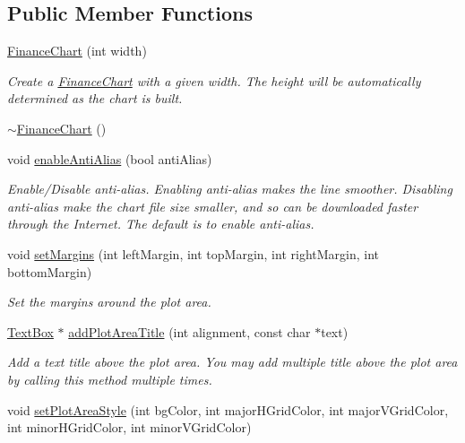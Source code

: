 \subsection*{Public Member Functions}
\begin{DoxyCompactItemize}
\item 
\hyperlink{class_finance_chart_a044a1d55c37501ea29ed2b5916faf0e1}{Finance\+Chart} (int width)
\begin{DoxyCompactList}\small\item\em Create a \hyperlink{class_finance_chart}{Finance\+Chart} with a given width. The height will be automatically determined as the chart is built. \end{DoxyCompactList}\item 
\hyperlink{class_finance_chart_a1e7439001aaf137a55e33a1add07f1eb}{$\sim$\+Finance\+Chart} ()
\item 
void \hyperlink{class_finance_chart_aa6caba757aea3f8bd1fd2a6c978a563d}{enable\+Anti\+Alias} (bool anti\+Alias)
\begin{DoxyCompactList}\small\item\em Enable/\+Disable anti-\/alias. Enabling anti-\/alias makes the line smoother. Disabling anti-\/alias make the chart file size smaller, and so can be downloaded faster through the Internet. The default is to enable anti-\/alias. \end{DoxyCompactList}\item 
void \hyperlink{class_finance_chart_a1d9be7f4a5ed8fc3a755028e9ba8a514}{set\+Margins} (int left\+Margin, int top\+Margin, int right\+Margin, int bottom\+Margin)
\begin{DoxyCompactList}\small\item\em Set the margins around the plot area. \end{DoxyCompactList}\item 
\hyperlink{class_text_box}{Text\+Box} $\ast$ \hyperlink{class_finance_chart_acf483e2850387592ab861effcd443eb6}{add\+Plot\+Area\+Title} (int alignment, const char $\ast$text)
\begin{DoxyCompactList}\small\item\em Add a text title above the plot area. You may add multiple title above the plot area by calling this method multiple times. \end{DoxyCompactList}\item 
void \hyperlink{class_finance_chart_ac11e35407682216b469143d64b0a22a5}{set\+Plot\+Area\+Style} (int bg\+Color, int major\+H\+Grid\+Color, int major\+V\+Grid\+Color, int minor\+H\+Grid\+Color, int minor\+V\+Grid\+Color)

\end{DoxyCompactItemize}
